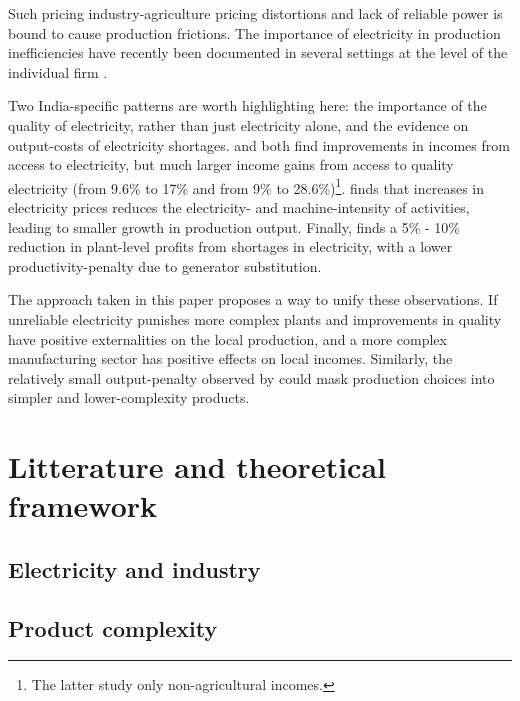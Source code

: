 \documentclass[11pt]{article}
\begin{document}
Such pricing industry-agriculture pricing distortions and lack of reliable power is bound to cause production frictions. The importance of electricity in production inefficiencies have recently been documented in several settings at the level of the individual firm \citep{grainger_impact_2017,abeberese_productivity_2019,fisher-vanden_electricity_2015}. 

Two India-specific patterns are worth highlighting here: the importance of the quality of electricity, rather than just electricity alone, and the evidence on output-costs of electricity shortages. \cite{samad_benefits_2016} and \cite{chakravorty_does_2014} both find improvements in incomes from access to electricity, but much larger income gains from access to quality electricity (from 9.6\% to 17\% and from 9\% to 28.6\%)\footnote{The latter study only non-agricultural incomes.}. \cite{abeberese_electricity_2017} finds that increases in electricity prices reduces the electricity- and machine-intensity of activities, leading to smaller growth in production output. Finally, \cite{allcott_how_2016} finds a 5\% - 10\% reduction in plant-level profits from shortages in electricity, with a lower productivity-penalty due to generator substitution.

The approach taken in this paper proposes a way to unify these observations. If unreliable electricity punishes more complex plants and improvements in quality have positive externalities on the local production, and a more complex manufacturing sector has positive effects on local incomes. Similarly, the relatively small output-penalty observed by \cite{allcott_how_2016} could mask production choices into simpler and lower-complexity products.


\section{Litterature and theoretical framework}%
\label{sec:framework}

\subsection{Electricity and industry}
\label{sub:elec}


\subsection{Product complexity}
\label{sec:frame-product-complexity}
\end{document}
